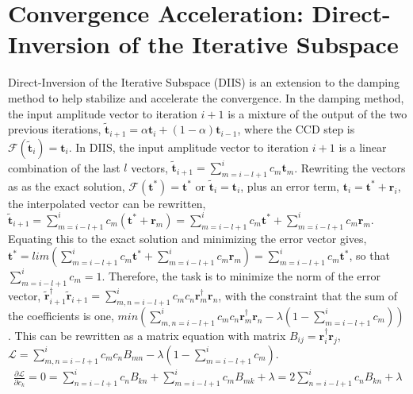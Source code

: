 \documentclass[thesis.tex]{subfiles}
\begin{document}
\chapter{Convergence Acceleration: Direct-Inversion of the Iterative Subspace}
Direct-Inversion of the Iterative Subspace (DIIS) is an extension to the damping method to help stabilize and accelerate the convergence. In the damping method, the input amplitude vector to iteration $i+1$ is a mixture of the output of the two previous iterations, $\mathbf{\tilde{t}}_{i+1}=\alpha\mathbf{t}_{i}+\left(1-\alpha\right)\mathbf{t}_{i-1}$, where the CCD step is $\mathcal{F}\left(\mathbf{\tilde{t}}_{i}\right)=\mathbf{t}_{i}$. In DIIS, the input amplitude vector to iteration $i+1$ is a linear combination of the last $l$ vectors, $\mathbf{\tilde{t}}_{i+1}=\sum_{m=i-l+1}^{i}c_{m}\mathbf{t}_{m}$. Rewriting the vectors as as the exact solution, $\mathcal{F}\left(\mathbf{t^{*}}\right)=\mathbf{t^{*}}$ or $\mathbf{\tilde{t}}_{i}=\mathbf{t}_{i}$, plus an error term, $\mathbf{t}_{i}=\mathbf{t^{*}}+\mathbf{r}_{i}$, the interpolated vector can be rewritten, $\mathbf{\tilde{t}}_{i+1}=\sum_{m=i-l+1}^{i}c_{m}\left(\mathbf{t^{*}}+\mathbf{r}_{m}\right)=\sum_{m=i-l+1}^{i}c_{m}\mathbf{t^{*}}+\sum_{m=i-l+1}^{i}c_{m}\mathbf{r}_{m}$. Equating this to the exact solution and minimizing the error vector gives, $\mathbf{t^{*}}=lim\left(\sum_{m=i-l+1}^{i}c_{m}\mathbf{t^{*}}+\sum_{m=i-l+1}^{i}c_{m}\mathbf{r}_{m}\right)=\sum_{m=i-l+1}^{i}c_{m}\mathbf{t^{*}}$, so that $\sum_{m=i-l+1}^{i}c_{m}=1$. Therefore, the task is to minimize the norm of the error vector, $\mathbf{\tilde{r}}_{i+1}^{\dagger}\mathbf{\tilde{r}}_{i+1}=\sum_{m,n=i-l+1}^{i}c_{m}c_{n}\mathbf{r}_{m}^{\dagger}\mathbf{r}_{n}$, with the constraint that the sum of the coefficients is one, $min\left(\sum_{m,n=i-l+1}^{i}c_{m}c_{n}\mathbf{r}_{m}^{\dagger}\mathbf{r}_{n}-\lambda\left(1-\sum_{m=i-l+1}^{i}c_{m}\right)\right)$. This can be rewritten as a matrix equation with matrix $B_{ij}=\mathbf{r}_{i}^{\dagger}\mathbf{r}_{j}$, $\mathcal{L}=\sum_{m,n=i-l+1}^{i}c_{m}c_{n}B_{mn}-\lambda\left(1-\sum_{m=i-l+1}^{i}c_{m}\right)$.
\begin{gather}
\frac{\partial\mathcal{L}}{\partial c_{k}}=0=\sum_{n=i-l+1}^{i}c_{n}B_{kn}+\sum_{m=i-l+1}^{i}c_{m}B_{mk}+\lambda=2\sum_{n=i-l+1}^{i}c_{n}B_{kn}+\lambda \\
\end{gather}
\end{document}

